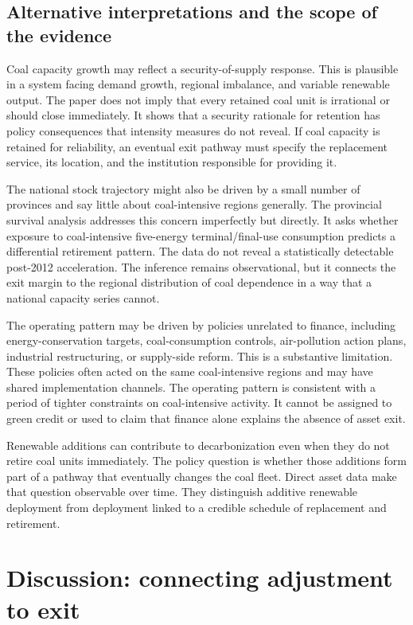\documentclass[11pt]{article}
\begin{document}
\subsection{Alternative interpretations and the scope of the evidence}

Coal capacity growth may reflect a security-of-supply response. This is plausible in a system facing demand growth, regional imbalance, and variable renewable output. The paper does not imply that every retained coal unit is irrational or should close immediately. It shows that a security rationale for retention has policy consequences that intensity measures do not reveal. If coal capacity is retained for reliability, an eventual exit pathway must specify the replacement service, its location, and the institution responsible for providing it.

The national stock trajectory might also be driven by a small number of provinces and say little about coal-intensive regions generally. The provincial survival analysis addresses this concern imperfectly but directly. It asks whether exposure to coal-intensive five-energy terminal/final-use consumption predicts a differential retirement pattern. The data do not reveal a statistically detectable post-2012 acceleration. The inference remains observational, but it connects the exit margin to the regional distribution of coal dependence in a way that a national capacity series cannot.

The operating pattern may be driven by policies unrelated to finance, including energy-conservation targets, coal-consumption controls, air-pollution action plans, industrial restructuring, or supply-side reform. This is a substantive limitation. These policies often acted on the same coal-intensive regions and may have shared implementation channels. The operating pattern is consistent with a period of tighter constraints on coal-intensive activity. It cannot be assigned to green credit or used to claim that finance alone explains the absence of asset exit.

Renewable additions can contribute to decarbonization even when they do not retire coal units immediately. The policy question is whether those additions form part of a pathway that eventually changes the coal fleet. Direct asset data make that question observable over time. They distinguish additive renewable deployment from deployment linked to a credible schedule of replacement and retirement.

\section{Discussion: connecting adjustment to exit}
\end{document}
